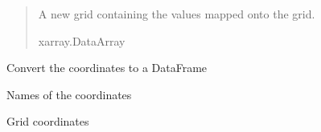 \documentclass[letterpaper,10pt,english]{sphinxmanual}
\begin{document}
\begin{fulllineitems}
\begin{fulllineitems}
\begin{quote}
\begin{description}
\begin{itemize}
\end{itemize}

\sphinxAtStartPar
{} \textendash{} A new grid containing the values mapped onto the grid.

\sphinxAtStartPar
xarray.DataArray

\end{description}\end{quote}

\end{fulllineitems}


\begin{fulllineitems}
\label{\detokenize{grid:glomar_gridding.grid.Grid.coord_df}}
\pysigstartsignatures
\pysigline
{}
\pysigstopsignatures
\sphinxAtStartPar
Convert the coordinates to a DataFrame

\end{fulllineitems}


\begin{fulllineitems}
\label{\detokenize{grid:glomar_gridding.grid.Grid.coord_names}}
\pysigstartsignatures
\pysigline
{}
\pysigstopsignatures
\sphinxAtStartPar
Names of the coordinates

\end{fulllineitems}


\begin{fulllineitems}
\label{\detokenize{grid:glomar_gridding.grid.Grid.coords}}
\pysigstartsignatures
\pysigline
{}
\pysigstopsignatures
\sphinxAtStartPar
Grid coordinates


\end{fulllineitems}
\end{fulllineitems}
\end{document}
